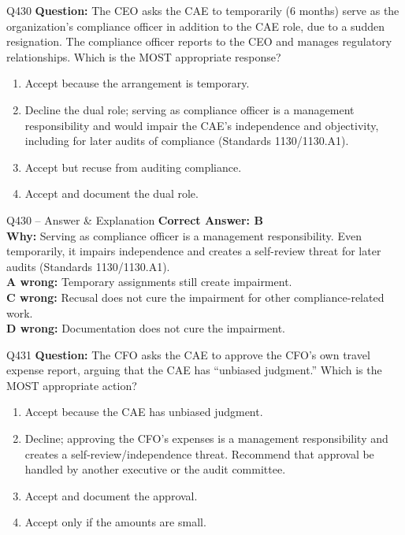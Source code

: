 \documentclass[aspectratio=169,10pt]{beamer}
\begin{document}
	\begin{frame}[t]{Q430}
		\small
		\textbf{Question:} The CEO asks the CAE to temporarily (6 months) serve as the organization's compliance officer in addition to the CAE role, due to a sudden resignation. The compliance officer reports to the CEO and manages regulatory relationships. Which is the MOST appropriate response?
		\begin{enumerate}[label=\Alph*.,itemsep=1pt,topsep=2pt]
			\item Accept because the arrangement is temporary.
			\item Decline the dual role; serving as compliance officer is a management responsibility and would impair the CAE's independence and objectivity, including for later audits of compliance (Standards 1130/1130.A1).
			\item Accept but recuse from auditing compliance.
			\item Accept and document the dual role.
		\end{enumerate}
	\end{frame}
	
	\begin{frame}[t]{Q430 -- Answer \& Explanation}
		\small
		\textbf{Correct Answer: B} \\[4pt]
		\textbf{Why:} Serving as compliance officer is a management responsibility. Even temporarily, it impairs independence and creates a self-review threat for later audits (Standards 1130/1130.A1). \\[4pt]
		\textbf{A wrong:} Temporary assignments still create impairment. \\[2pt]
		\textbf{C wrong:} Recusal does not cure the impairment for other compliance-related work. \\[2pt]
		\textbf{D wrong:} Documentation does not cure the impairment.
	\end{frame}
	
	\begin{frame}[t]{Q431}
		\small
		\textbf{Question:} The CFO asks the CAE to approve the CFO's own travel expense report, arguing that the CAE has ``unbiased judgment.'' Which is the MOST appropriate action?
		\begin{enumerate}[label=\Alph*.,itemsep=1pt,topsep=2pt]
			\item Accept because the CAE has unbiased judgment.
			\item Decline; approving the CFO's expenses is a management responsibility and creates a self-review/independence threat. Recommend that approval be handled by another executive or the audit committee.
			\item Accept and document the approval.
			\item Accept only if the amounts are small.
		\end{enumerate}
	\end{frame}
	
\end{document}
